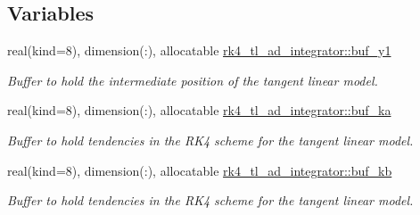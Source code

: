 \subsection*{Variables}
\begin{DoxyCompactItemize}
\item 
real(kind=8), dimension(\+:), allocatable \hyperlink{namespacerk4__tl__ad__integrator_a7a8fd6a2de598bb23bef4d88ddadbed2}{rk4\+\_\+tl\+\_\+ad\+\_\+integrator\+::buf\+\_\+y1}
\begin{DoxyCompactList}\small\item\em Buffer to hold the intermediate position of the tangent linear model. \end{DoxyCompactList}\item 
real(kind=8), dimension(\+:), allocatable \hyperlink{namespacerk4__tl__ad__integrator_a076c0ff20536d9911a40c81565a0ba25}{rk4\+\_\+tl\+\_\+ad\+\_\+integrator\+::buf\+\_\+ka}
\begin{DoxyCompactList}\small\item\em Buffer to hold tendencies in the R\+K4 scheme for the tangent linear model. \end{DoxyCompactList}\item 
real(kind=8), dimension(\+:), allocatable \hyperlink{namespacerk4__tl__ad__integrator_aed1e8c65a9882bdc18b4634fee0656f1}{rk4\+\_\+tl\+\_\+ad\+\_\+integrator\+::buf\+\_\+kb}
\begin{DoxyCompactList}\small\item\em Buffer to hold tendencies in the R\+K4 scheme for the tangent linear model. \end{DoxyCompactList}\end{DoxyCompactItemize}
